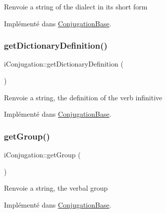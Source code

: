 \begin{DoxyReturn}{Renvoie}
a string of the dialect in its short form 
\end{DoxyReturn}


Implémenté dans \hyperlink{classConjugationBase_a5010621a363fcfe26e5d23ade06d2c41}{Conjugation\+Base}.

\hypertarget{interfaceiConjugation_ab13cedc1b4f0d064a9bfff3cbfb63de6}{}\label{interfaceiConjugation_ab13cedc1b4f0d064a9bfff3cbfb63de6} 
\subsubsection{\texorpdfstring{get\+Dictionary\+Definition()}{getDictionaryDefinition()}}
{\footnotesize\ttfamily i\+Conjugation\+::get\+Dictionary\+Definition (\begin{DoxyParamCaption}{ }\end{DoxyParamCaption})}

\begin{DoxyReturn}{Renvoie}
a string, the definition of the verb infinitive 
\end{DoxyReturn}


Implémenté dans \hyperlink{classConjugationBase_aae493e154b07045a3ea072760ac44ef4}{Conjugation\+Base}.

\hypertarget{interfaceiConjugation_a21390064de33a77b99b26ec5a2e55351}{}\label{interfaceiConjugation_a21390064de33a77b99b26ec5a2e55351} 
\subsubsection{\texorpdfstring{get\+Group()}{getGroup()}}
{\footnotesize\ttfamily i\+Conjugation\+::get\+Group (\begin{DoxyParamCaption}{ }\end{DoxyParamCaption})}

\begin{DoxyReturn}{Renvoie}
a string, the verbal group 
\end{DoxyReturn}


Implémenté dans \hyperlink{classConjugationBase_aa88c93007f333b916a6a51819e50e8ae}{Conjugation\+Base}.

\hypertarget{interfaceiConjugation_a2b6dd0a979a98bc50f6f9f7ec9b69e63}{}\label{interfaceiConjugation_a2b6dd0a979a98bc50f6f9f7ec9b69e63} 

